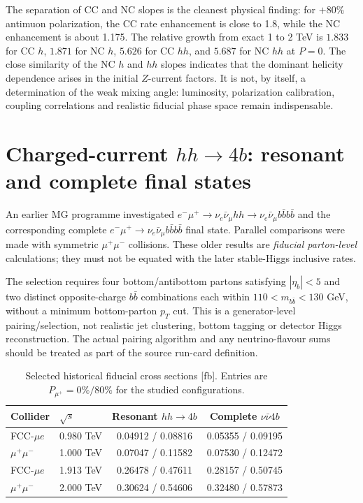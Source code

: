 \documentclass[12pt,a4paper]{article}
\newcommand{\newnote}{\clearpage}
\begin{document}
The separation of CC and NC slopes is the cleanest physical finding: for $+80\%$ antimuon polarization, the CC rate enhancement is close to 1.8, while the NC enhancement is about 1.175. The relative growth from exact 1 to 2 TeV is $1.833$ for CC $h$, $1.871$ for NC $h$, $5.626$ for CC $hh$, and $5.687$ for NC $hh$ at $P=0$. The close similarity of the NC $h$ and $hh$ slopes indicates that the dominant helicity dependence arises in the initial $Z$-current factors. It is not, by itself, a determination of the weak mixing angle: luminosity, polarization calibration, coupling correlations and realistic fiducial phase space remain indispensable.



\newnote

\section{Charged-current $hh\to4b$: resonant and complete final states}

An earlier MG programme investigated $e^-\mu^+\to\nu_e\bar\nu_\mu hh\to\nu_e\bar\nu_\mu b\bar b b\bar b$ and the corresponding complete $e^-\mu^+\to\nu_e\bar\nu_\mu b\bar b b\bar b$ final state. Parallel comparisons were made with symmetric $\mu^+\mu^-$ collisions. These older results are \emph{fiducial parton-level} calculations; they must not be equated with the later stable-Higgs inclusive rates.

The selection requires four bottom/antibottom partons satisfying $|\eta_b|<5$ and two distinct opposite-charge $b\bar b$ combinations each within $110<m_{b\bar b}<130$ GeV, without a minimum bottom-parton $p_T$ cut. This is a generator-level pairing/selection, not realistic jet clustering, bottom tagging or detector Higgs reconstruction. The actual pairing algorithm and any neutrino-flavour sums should be treated as part of the source run-card definition.


\begin{table}[H]
\centering\small
\caption{Selected historical fiducial cross sections [fb]. Entries are $P_{\mu^+}=0\%/80\%$ for the studied configurations.}
\begin{tabular}{@{}llcc@{}}\toprule Collider & $\sqrt{s}$ & Resonant $hh\to4b$ & Complete $\nu\bar\nu4b$\\\midrule
FCC-$\mu e$ & 0.980 TeV & 0.04912 / 0.08816 & 0.05355 / 0.09195\\
$\mu^+\mu^-$ & 1.000 TeV & 0.07047 / 0.11582 & 0.07530 / 0.12472\\
FCC-$\mu e$ & 1.913 TeV & 0.26478 / 0.47611 & 0.28157 / 0.50745\\
$\mu^+\mu^-$ & 2.000 TeV & 0.30624 / 0.54606 & 0.32480 / 0.57873\\\bottomrule
\end{tabular}
\end{table}
\end{document}
